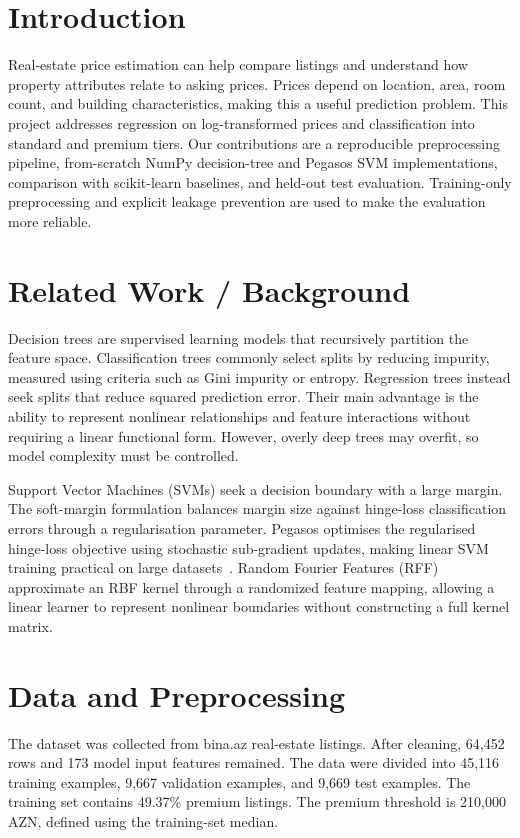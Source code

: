 \documentclass[10pt,twocolumn,a4paper]{article}
\begin{document}
\section{Introduction}
Real-estate price estimation can help compare listings and understand how property attributes relate to asking prices. Prices depend on location, area, room count, and building characteristics, making this a useful prediction problem. This project addresses regression on log-transformed prices and classification into standard and premium tiers. Our contributions are a reproducible preprocessing pipeline, from-scratch NumPy decision-tree and Pegasos SVM implementations, comparison with scikit-learn baselines, and held-out test evaluation. Training-only preprocessing and explicit leakage prevention are used to make the evaluation more reliable.

\section{Related Work / Background}
Decision trees are supervised learning models that recursively partition
the feature space. Classification trees commonly select splits by reducing
impurity, measured using criteria such as Gini impurity or entropy.
Regression trees instead seek splits that reduce squared prediction error.
Their main advantage is the ability to represent nonlinear relationships
and feature interactions without requiring a linear functional form.
However, overly deep trees may overfit, so model complexity must be controlled.

Support Vector Machines (SVMs) seek a decision boundary with a large margin.
The soft-margin formulation balances margin size against hinge-loss
classification errors through a regularisation parameter. Pegasos optimises
the regularised hinge-loss objective using stochastic sub-gradient updates,
making linear SVM training practical on large datasets~\cite{pegasos}.
Random Fourier Features (RFF) approximate an RBF kernel through a randomized
feature mapping, allowing a linear learner to represent nonlinear boundaries
without constructing a full kernel matrix.

\section{Data and Preprocessing}
The dataset was collected from bina.az real-estate listings. After cleaning,
64,452 rows and 173 model input features remained. The data were divided into
45,116 training examples, 9,667 validation examples, and 9,669 test examples.
The training set contains 49.37\% premium listings. The premium threshold is
210,000 AZN, defined using the training-set median.
\end{document}
